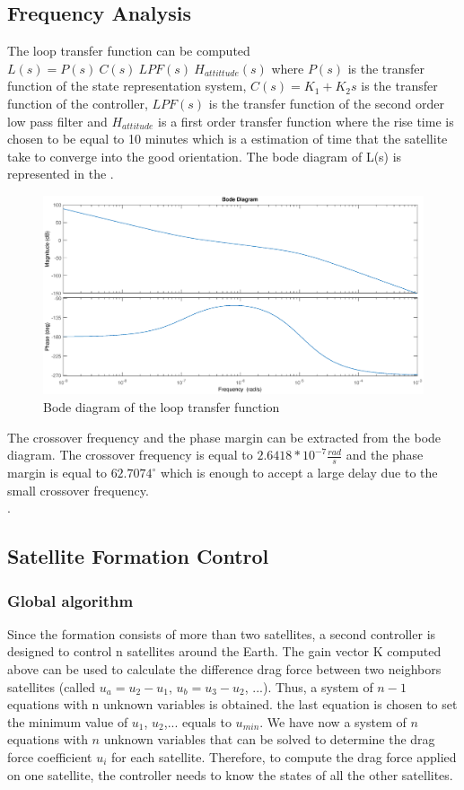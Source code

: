  \subsection{Frequency Analysis}
The loop transfer function can be computed $L(s) = P(s) \ C(s) \ LPF(s) \ H_{attittude}(s)$ where $P(s)$ is the transfer function of the state representation system, $C(s) = K_1 + K_2 s$ is the transfer function of the controller, $LPF(s)$ is the transfer function of the second order low pass filter and $H_{attitude}$ is a first order transfer function where the rise time is chosen to be equal to 10 minutes which is a estimation of time that the satellite take to converge into the good orientation.
The bode diagram of L(s) is represented in the . \\
\begin{figure}[H]
	\centering
	\includegraphics[width=0.9\linewidth]
	{figures/Bode_L.eps}
	\caption{Bode diagram of the loop transfer function}
	\label{fig:Bode_L}
\end{figure}
The crossover frequency and the phase margin can be extracted from the bode diagram. The crossover frequency is equal to $2.6418*10^{-7}\frac{rad}{s}$ and the phase margin is equal to $62.7074^{\circ}$ which is enough to accept a large delay due to the small crossover frequency. \\.
 
\subsection{Satellite Formation Control} 
\subsubsection{Global algorithm}
Since the formation consists of more than two satellites, a second controller is designed to control n satellites around the Earth. The gain vector K computed above can be used to calculate the difference drag force between two neighbors satellites (called $u_a = u_2 - u_1$, $u_b = u_3 - u_2$, ...). Thus, a system of $n-1$ equations with n unknown variables is obtained. the last equation is chosen to set the minimum value of $u_1$, $u_2$,... equals to $u_{min}$. We have now a system of $n$ equations with $n$ unknown variables that can be solved to determine the drag force coefficient $u_i$ for each satellite. Therefore, to compute the drag force applied on one satellite, the controller needs to know the states of all the other satellites.
